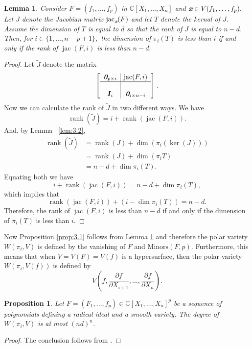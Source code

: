 \documentclass[a4paper]{article}
\def\bz{\textit{\textbf{0}}}
\def\xb{\textit{\textbf{x}}}
\def\jt{\widetilde{J}}
\DeclareMathOperator{\jac}{jac}
\DeclareMathOperator{\rank}{rank}
\def\minors{\textrm{Minors}(F,p)}
\def\pa{\partial}
\def\C{\mathbb{C}}
\def\Wi{W(\pi_i,V)}
\newtheorem{lemma}[theorem]{Lemma}
\newtheorem{prop}[theorem]{Proposition}
\begin{document}
%
%
\begin{lemma}\label{lem:3.3}
Consider $F=(f_1,\hdots,f_p)$ in $\C[X_1,\hdots,X_n]$ and $\xb \in V(f_1,\hdots,f_p).$ Let $J$ denote the Jacobian matrix $\jac_{\xb}( F)$ and let $T$ denote the kernal of $J.$ Assume the dimension of $T$ is equal to $d$ so that the rank of $J$ is equal to $n-d.$ Then, for $i \in \{1,\hdots,n-p+1\},$  the dimension of $\pi_i(T)$ is less than $i$ if and only if the rank of $\jac(F,i)$ is less than $n-d.$
\end{lemma} 
%
%
\begin{proof}
Let $\jt$ denote the matrix 
\[ 
\left[
\begin{array}{c|c}
\bz_{p \times i} & \jac(F,i)  \\
\hline \\
\bm I_i & \bz_{i \times n-i}  
\end{array}
\right].
\]
Now we can calculate the rank of $\jt$ in two different ways. We have 
\[
\rank(\jt) = i + \rank(\jac(F,i)).\] And, by Lemma ~\ref{lem:3.2}, 
\begin{align*}
    \rank(\jt) &= \rank(J) + \dim(\pi_i(\ker(J)))\\ 
    &= \rank(J) + \dim(\pi_iT) \\
    &= n-d + \dim \pi_i (T).
\end{align*}
Equating both we have \[
i + \rank(\jac(F,i)) = n-d + \dim\pi_i(T),
\]
which implies that 
\[
\rank(\jac(F,i)) + (i -\dim\pi_i (T) )= n-d.
\]
Therefore, the rank of $\jac(F,i)$ is less than $n-d$ if and only if the dimension of $\pi_i (T)$ is less than $i.$
\end{proof}
%
Now Proposition \ref{prop:3.1} follows from Lemma \ref{lem:3.3} and therefore the polar variety $\Wi$ is defined by the vanishing of $F$ and $\minors.$ Furthermore, this means that when $V=V(F)=V(f)$ is a hypersurface, then the polar variety $W(\pi_i,V(f))$ is defined by  
\[
V\left(f,\frac{\pa f}{\pa
  X_{i+1}},\hdots,\frac{\pa f}{\pa X_n}\right).
\] 
%
%
\begin{prop}\label{prop:degreePolarV}
Let $F=(F_1,\hdots,f_p) \in \C[X_1,\hdots,X_n]^p$ be a sequence of polynomials defining a radical ideal and a smooth variety. The degree of $\Wi$ is at most $(nd)^n$.
\end{prop}
\begin{proof}
The conclusion follows from \cite[Proposition 2.3]{Heintz1980}.
\end{proof}



\end{document}
